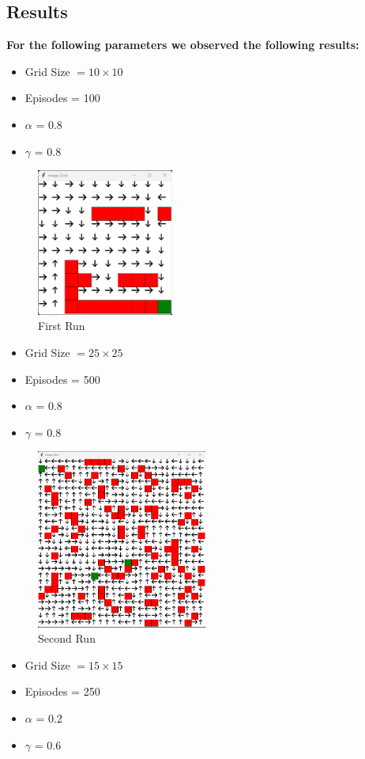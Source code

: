 \documentclass{article}
\begin{document}
\subsection{Results}

\textbf{For the following parameters we observed the following results:}
\begin{itemize}
    \item Grid Size $= 10 \times 10$
    \item Episodes = 100
    \item $\alpha$ = 0.8 
    \item $\gamma$ = 0.8
\end{itemize}

\begin{figure}[H]
  \centering
  \includegraphics[width=0.4\textwidth, height=0.25\textheight]{images/grid_1.png}
  \caption{First Run}
\end{figure}

\begin{itemize}
    \item Grid Size $= 25 \times 25$
    \item Episodes = 500
    \item $\alpha$ = 0.8 
    \item $\gamma$ = 0.8
\end{itemize}

\begin{figure}[H]
  \centering
  \includegraphics[width=0.5\textwidth, height=0.3\textheight]{images/grid_2.png}
  \caption{Second Run}
\end{figure}
\begin{itemize}
    \item Grid Size $= 15 \times 15$
    \item Episodes = 250
    \item $\alpha$ = 0.2 
    \item $\gamma$ = 0.6
\end{itemize}
\end{document}
